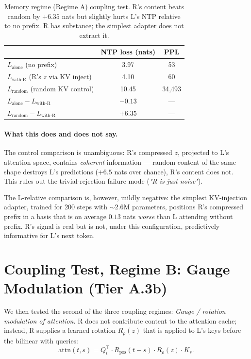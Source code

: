 \documentclass[10pt, twocolumn, a4paper]{article}
\begin{document}
\begin{table}[h]
\centering\small
\begin{tabular}{@{}lcc@{}}
\toprule
& \textbf{NTP loss (nats)} & \textbf{PPL} \\
\midrule
$L_{\text{alone}}$ (no prefix)               & 3.97 & 53 \\
$L_{\text{with-R}}$ (R's $z$ via KV inject)  & 4.10 & 60 \\
$L_{\text{random}}$ (random KV control)      & 10.45 & 34{,}493 \\
\midrule
$L_{\text{alone}} - L_{\text{with-R}}$ & $-0.13$ & --- \\
$L_{\text{random}} - L_{\text{with-R}}$ & $\mathbf{+6.35}$ & --- \\
\bottomrule
\end{tabular}
\caption{Memory regime (Regime A) coupling test. R's content beats random by $+6.35$ nats but slightly hurts L's NTP relative to no prefix. R has substance; the simplest adapter does not extract it.}
\label{tab:regime_a}
\end{table}

\paragraph{What this does and does not say.}
The control comparison is unambiguous: R's compressed $z$, projected to
L's attention space, contains \emph{coherent} information --- random
content of the same shape destroys L's predictions ($+6.5$ nats over
chance), R's content does not. This rules out the trivial-rejection
failure mode (\textit{"R is just noise"}).

The L-relative comparison is, however, mildly negative: the simplest
KV-injection adapter, trained for 200 steps with $\sim 2.6$M parameters,
positions R's compressed prefix in a basis that is on average $0.13$ nats
\emph{worse} than L attending without prefix. R's signal is real but is
not, under this configuration, predictively informative for L's next
token.

\section{Coupling Test, Regime B: Gauge Modulation (Tier A.3b)}
\label{sec:regime_b}

We then tested the second of the three coupling regimes: \emph{Gauge / rotation modulation of attention}. R does not contribute content to the attention cache; instead, R supplies a learned rotation $R_\rho(z)$ that is applied to L's keys before the bilinear with queries:
\[
\text{attn}(t, s) = Q_t^\top \cdot R_{\text{pos}}(t-s) \cdot R_\rho(z) \cdot K_s.
\]
\end{document}

